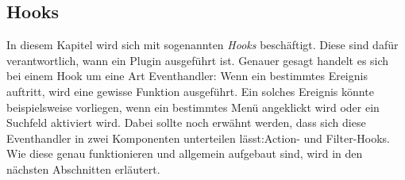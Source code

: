 \subsection{Hooks}\label{sub_acvsfs}
In diesem Kapitel wird sich mit sogenannten \emph{Hooks} beschäftigt. Diese sind dafür verantwortlich, wann ein Plugin ausgeführt ist. 
Genauer gesagt handelt es sich bei einem Hook um eine Art Eventhandler: Wenn ein bestimmtes Ereignis auftritt, wird eine gewisse Funktion ausgeführt. Ein solches Ereignis könnte beispielsweise vorliegen, wenn ein bestimmtes Menü angeklickt wird oder ein Suchfeld aktiviert wird.\newline
Dabei sollte noch erwähnt werden, dass sich diese Eventhandler in zwei Komponenten unterteilen lässt:Action- und Filter-Hooks.\newline
Wie diese genau funktionieren und allgemein aufgebaut sind, wird in den nächsten Abschnitten erläutert.

